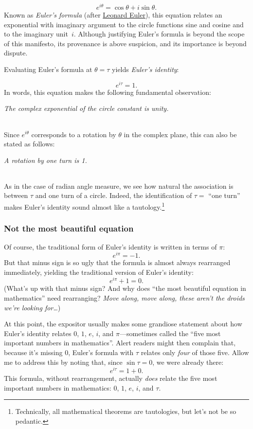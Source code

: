 \documentclass{article}
\begin{document}
\[ e^{i\theta} = \cos\theta + i\sin\theta. \]
Known as \emph{Euler's formula} (after \href{http://en.wikipedia.org/wiki/Leonhard_Euler}{Leonard Euler}), this equation relates an exponential with imaginary argument to the circle functions sine and cosine and to the imaginary unit~$i$. Although justifying Euler's formula is beyond the scope of this manifesto, its provenance is above suspicion, and its importance is beyond dispute.

Evaluating Euler's formula at $\theta = \tau$ yields \emph{Euler's identity}:

\[ e^{i\tau} = 1. \]
In words, this equation makes the following fundamental observation: 

\begin{center}
\emph{The complex exponential of the circle constant is unity.}
\end{center} 

~\\

\noindent Since $e^{i\theta}$ corresponds to a rotation by $\theta$ in the complex plane, this can also be stated as follows:

\begin{center}
\emph{A rotation by one turn is 1.}
\end{center}

~\\

\noindent As in the case of radian angle measure, we see how natural the association is between $\tau$ and one turn of a circle. Indeed, the identification of $\tau = $ ``one turn'' makes Euler's identity sound almost like a tautology.\footnote{Technically, all mathematical theorems are tautologies, but let's not be so pedantic.}

    \subsubsection{Not the most beautiful equation} %

Of course, the traditional form of Euler's identity is written in terms of $\pi$:
\[ e^{i\pi} = -1. \]
But that minus sign is so ugly that the formula is almost always rearranged immediately, yielding the traditional version of Euler's identity:
\[ e^{i\pi} + 1 = 0. \]
(What's up with that minus sign? And why does ``the most beautiful equation in mathematics'' need rearranging? \emph{Move along, move along, these aren't the droids we're looking for\ldots})

At this point, the expositor usually makes some grandiose statement about how Euler's identity relates $0$, $1$, $e$, $i$, and $\pi$---sometimes called the ``five most important numbers in mathematics''. Alert readers might then complain that, because it's missing $0$, Euler's formula with $\tau$ relates only \emph{four} of those five. Allow me to address this by noting that, since $\sin\tau = 0$, we were already there:
\[ e^{i\tau} = 1 + 0. \]
This formula, without rearrangement, actually \emph{does} relate the five most important numbers in mathematics: $0$, $1$, $e$, $i$, and $\tau$.
\end{document}
